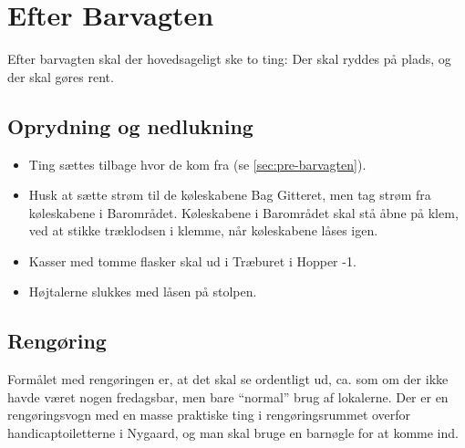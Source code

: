 \section{Efter Barvagten}
\label{sec:post-barvagten}

Efter barvagten skal der hovedsageligt ske to ting: Der skal ryddes på
plads, og der skal gøres rent.

\subsection{Oprydning og nedlukning}
\label{sec:post:oprydning}

\begin{itemize}
	\item Ting sættes tilbage hvor de kom fra (se
	\autoref{sec:pre-barvagten}). 
	\item Husk at sætte strøm til de køleskabene Bag Gitteret, 
	men tag strøm fra køleskabene i Barområdet. 
	Køleskabene i Barområdet skal stå åbne på klem, 
	ved at stikke træklodsen i klemme, når køleskabene låses igen.
	\item Kasser med tomme flasker skal ud i Træburet i Hopper -1.
	\item Højtalerne slukkes med låsen på stolpen.
\end{itemize}

\subsection{Rengøring}
\label{sec:post:rengoring}

Formålet med rengøringen er, at det skal se ordentligt ud, ca. som om
der ikke havde været nogen fredagsbar, men bare ``normal'' brug af
lokalerne. Der er en rengøringsvogn med en masse praktiske ting i
rengøringsrummet overfor handicaptoiletterne i Nygaard, 
og man skal bruge en barnøgle for at komme ind.

